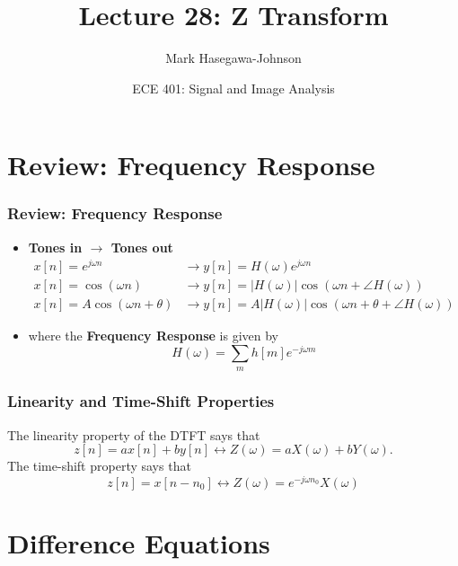 \documentclass{beamer}
\title{Lecture 28: Z Transform}
\author{Mark Hasegawa-Johnson}
\date{ECE 401: Signal and Image Analysis}
\begin{document}
\begin{frame}
  \maketitle
\end{frame}

\begin{frame}
  \tableofcontents
\end{frame}

\section[Review]{Review: Frequency Response}
\setcounter{subsection}{1}

\begin{frame}
  \frametitle{Review: Frequency Response}
  \begin{itemize}
  \item {\bf Tones in $\rightarrow$ Tones out}
    \begin{align*}
      x[n]=e^{j\omega n} &\rightarrow y[n]=H(\omega)e^{j\omega n}\\
      x[n]=\cos\left(\omega n\right)
      &\rightarrow y[n]=|H(\omega)|\cos\left(\omega n+\angle H(\omega)\right)\\
      x[n]=A\cos\left(\omega n+\theta\right)
      &\rightarrow y[n]=A|H(\omega)|\cos\left(\omega n+\theta+\angle H(\omega)\right)
    \end{align*}
  \item where the {\bf Frequency Response} is given by
    \[
    H(\omega) = \sum_m h[m]e^{-j\omega m}
    \]
  \end{itemize}
\end{frame}  

\begin{frame}
  \frametitle{Linearity and Time-Shift Properties}

  The linearity property of the DTFT says that
  \[
  z[n]= ax[n]+by[n]\leftrightarrow Z(\omega) = aX(\omega)+bY(\omega).
  \]
  The time-shift property says that
  \[
  z[n]= x[n-n_0] \leftrightarrow Z(\omega) = e^{-j\omega n_0} X(\omega)
  \]
\end{frame}

\section{Difference Equations}
\setcounter{subsection}{1}
\end{document}
